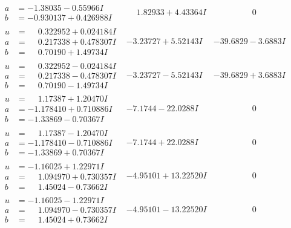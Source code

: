 \documentclass[1p]{elsarticle_modified}
\theoremstyle{definition}
\begin{document}
$$\begin{array}{c|c|c}
\begin{aligned}
a &= -1.38035 - 0.55966 I \\
b &= -0.930137 + 0.426988 I\end{aligned}
 & \phantom{-}1.82933 + 4.43364 I & \phantom{-0.000000 } 0 \\ \hline\begin{aligned}
u &= \phantom{-}0.322952 + 0.024184 I \\
a &= \phantom{-}0.217338 + 0.478307 I \\
b &= \phantom{-}0.70190 + 1.49734 I\end{aligned}
 & -3.23727 + 5.52143 I & -39.6829 - 3.6883 I \\ \hline\begin{aligned}
u &= \phantom{-}0.322952 - 0.024184 I \\
a &= \phantom{-}0.217338 - 0.478307 I \\
b &= \phantom{-}0.70190 - 1.49734 I\end{aligned}
 & -3.23727 - 5.52143 I & -39.6829 + 3.6883 I \\ \hline\begin{aligned}
u &= \phantom{-}1.17387 + 1.20470 I \\
a &= -1.178410 + 0.710886 I \\
b &= -1.33869 - 0.70367 I\end{aligned}
 & -7.1744 - 22.0288 I & \phantom{-0.000000 } 0 \\ \hline\begin{aligned}
u &= \phantom{-}1.17387 - 1.20470 I \\
a &= -1.178410 - 0.710886 I \\
b &= -1.33869 + 0.70367 I\end{aligned}
 & -7.1744 + 22.0288 I & \phantom{-0.000000 } 0 \\ \hline\begin{aligned}
u &= -1.16025 + 1.22971 I \\
a &= \phantom{-}1.094970 + 0.730357 I \\
b &= \phantom{-}1.45024 - 0.73662 I\end{aligned}
 & -4.95101 + 13.22520 I & \phantom{-0.000000 } 0 \\ \hline\begin{aligned}
u &= -1.16025 - 1.22971 I \\
a &= \phantom{-}1.094970 - 0.730357 I \\
b &= \phantom{-}1.45024 + 0.73662 I\end{aligned}
 & -4.95101 - 13.22520 I & \phantom{-0.000000 } 0 \\ \hline\begin{aligned}

\end{aligned}
\end{array}$$
\end{document}

